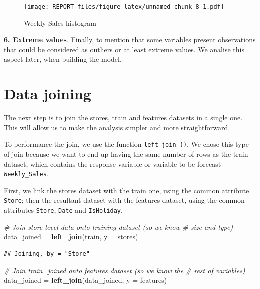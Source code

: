 \documentclass[11pt,]{article}
\newenvironment{Shaded}{\begin{snugshade}}{\end{snugshade}}
\newcommand{\KeywordTok}[1]{\textcolor[rgb]{0.13,0.29,0.53}{\textbf{{#1}}}}
\newcommand{\DataTypeTok}[1]{\textcolor[rgb]{0.13,0.29,0.53}{{#1}}}
\newcommand{\StringTok}[1]{\textcolor[rgb]{0.31,0.60,0.02}{{#1}}}
\newcommand{\CommentTok}[1]{\textcolor[rgb]{0.56,0.35,0.01}{\textit{{#1}}}}
\newcommand{\NormalTok}[1]{{#1}}
\begin{document}
\begin{figure}[htbp]
\centering
\texttt{[image: REPORT\_files/figure-latex/unnamed-chunk-8-1.pdf]}
\caption{Weekly Sales histogram}
\end{figure}

\textbf{6. Extreme values}. Finally, to mention that some variables
present observations that could be considered as outliers or at least
extreme values. We analise this aspect later, when building the model.

\section{Data joining}\label{data-joining}

The next step is to join the stores, train and features datasets in a
single one. This will allow us to make the analysis simpler and more
straightforward.

To performance the join, we use the function \texttt{left\_join\ ()}. We
chose this type of join because we want to end up having the same number
of rows as the train dataset, which contains the response variable or
variable to be forecast \texttt{Weekly\_Sales}.

First, we link the stores dataset with the train one, using the common
attribute \texttt{Store}; then the resultant dataset with the features
dataset, using the common attributes \texttt{Store}, \texttt{Date} and
\texttt{IsHoliday}.

\begin{Shaded}
\begin{Highlighting}[]
\CommentTok{# Join store-level data onto training dataset (so we know}
\CommentTok{# size and type)}
\NormalTok{data_joined =}\StringTok{ }\KeywordTok{left_join}\NormalTok{(train, }\DataTypeTok{y =} \NormalTok{stores)}
\end{Highlighting}
\end{Shaded}

\begin{verbatim}
## Joining, by = "Store"
\end{verbatim}

\begin{Shaded}
\begin{Highlighting}[]
\CommentTok{# Join train_joined onto features dataset (so we know the}
\CommentTok{# rest of variables)}
\NormalTok{data_joined =}\StringTok{ }\KeywordTok{left_join}\NormalTok{(data_joined, }\DataTypeTok{y =} \NormalTok{features)}
\end{Highlighting}
\end{Shaded}
\end{document}
